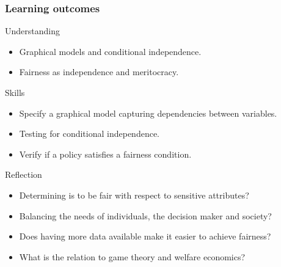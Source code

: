 \begin{frame}[squeeze]
  \frametitle{Learning outcomes}
  \begin{block}{Understanding}
    \begin{itemize}
    \item Graphical models and conditional independence.
    \item Fairness as independence and meritocracy.
    \end{itemize}
  \end{block}
  
  \begin{block}{Skills}
    \begin{itemize}
    \item Specify a graphical model capturing dependencies between variables.
    \item Testing for conditional independence.
    \item Verify if a policy satisfies a fairness condition.
    \end{itemize}
  \end{block}

  \begin{block}{Reflection}
    \begin{itemize}
    \item Determining is to be fair with respect to sensitive attributes?
    \item Balancing the needs of individuals, the decision maker and society?
    \item Does having more data available make it easier to achieve fairness?
    \item What is the relation to game theory and welfare economics?
    \end{itemize}
  \end{block}
  
\end{frame}





